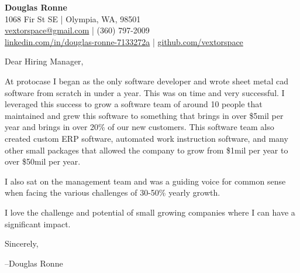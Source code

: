 \documentclass[letter,12pt]{article}
\begin{document}
\begin{center}
    {\Huge \textbf{Douglas Ronne}}\\
    \vspace{2mm}
    1068 Fir St SE | Olympia, WA, 98501\\
    \href{mailto:vextorspace@gmail.com}{vextorspace@gmail.com} | (360) 797-2009\\
    \href{www.linkedin.com/in/douglas-ronne-7133272a}{linkedin.com/in/douglas-ronne-7133272a} | \href{https://github.com/vextorspace}{github.com/vextorspace}
\end{center}

Dear Hiring Manager,

\vspace{.5cm}
\noindent
At protocase I began as the only software developer and wrote sheet metal cad software from scratch in under a year. This was on time and very successful. I leveraged this success to grow a software team of around 10 people that maintained and grew this software to something that brings in over \$5mil per year and brings in over 20\% of our new customers. This software team also created custom ERP software, automated work instruction software, and many other small packages that allowed the company to grow from \$1mil per year to over \$50mil per year.

\vspace{.5cm}
\noindent
I also sat on the management team and was a guiding voice for common sense when facing the various challenges of 30-50\% yearly growth.

\vspace{.5cm}
\noindent
I love the challenge and potential of small growing companies where I can have a significant impact.

\vspace{1cm}
\noindent
Sincerely,

\noindent
--Douglas Ronne
\end{document}
